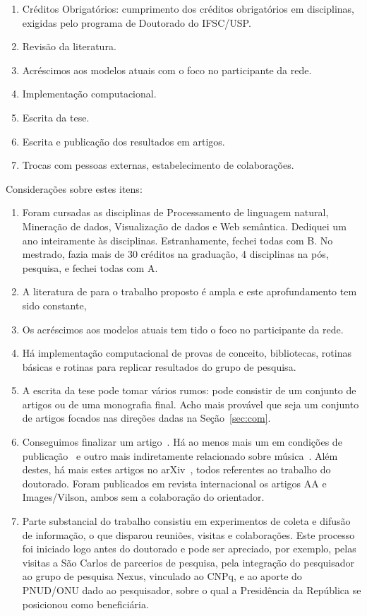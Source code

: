 \documentclass[a4paper,openright,12pt]{report} %
\begin{document}
\begin{enumerate}
\item Créditos Obrigatórios: cumprimento dos créditos obrigatórios em disciplinas, exigidas pelo programa de Doutorado do IFSC/USP.

\item Revisão da literatura.

\item Acréscimos aos modelos atuais com o foco no participante da rede.

\item Implementação computacional.

\item Escrita da tese.

\item Escrita e publicação dos resultados em artigos.

\item Trocas com pessoas externas, estabelecimento de colaborações.
\end{enumerate}

Considerações sobre estes itens:
\begin{enumerate}
\item Foram cursadas as disciplinas de Processamento de linguagem natural, Mineração de dados, Visualização de dados e Web semântica. Dediquei um ano inteiramente às disciplinas. Estranhamente, fechei todas com B. No mestrado, fazia mais de 30 créditos na graduação, 4 disciplinas na pós, pesquisa, e fechei todas com A.
\item A literatura de para o trabalho proposto é ampla e este aprofundamento tem sido constante,
\item Os acréscimos aos modelos atuais tem tido o foco no participante da rede.
\item Há implementação computacional de provas de conceito, bibliotecas, rotinas básicas e rotinas para replicar resultados do grupo de pesquisa.

\item A escrita da tese pode tomar vários rumos: pode consistir de um conjunto de artigos ou de uma monografia final. Acho mais provável que seja um conjunto de artigos focados nas direções dadas na Seção~\ref{sec:com}.
\item Conseguimos finalizar um artigo~\cite{timeS}. Há ao menos mais um em condições de publicação~\cite{ops} e outro mais indiretamente relacionado sobre música~\cite{mass}. Além destes, há mais estes artigos no arXiv~\cite{ensaio,connectiveDiff,XXX,YY}, todos referentes ao trabalho do doutorado. Foram publicados em revista internacional os artigos AA e Images/Vilson, ambos sem a colaboração do orientador.
\item Parte substancial do trabalho consistiu em experimentos de coleta e difusão de informação, o que disparou reuniões, visitas e colaborações. Este processo foi iniciado logo antes do doutorado e pode ser apreciado, por exemplo, pelas visitas a São Carlos de parcerios de pesquisa, pela integração do pesquisador ao grupo de pesquisa Nexus, vinculado ao CNPq, e ao aporte do PNUD/ONU dado ao pesquisador, sobre o qual a Presidência da República se posicionou como beneficiária.
\end{enumerate}
\end{document}
